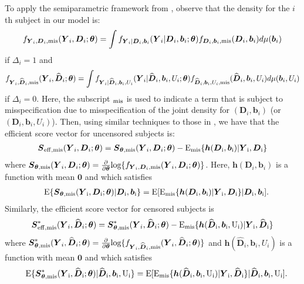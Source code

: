 \documentclass[12pt]{article}
\def\log{\hbox{log}}
\def\bse{\begin{eqnarray*}}
\def\ese{\end{eqnarray*}}
\def\be{\begin{eqnarray}}
\def\ee{\end{eqnarray}}
\def\bse{\begin{eqnarray*}}
\def\ese{\end{eqnarray*}}
\def\bS{{\mathbf S}}
\def\bzero{{\mathbf 0}}
\def\btheta{{\boldsymbol{\theta}}}
\def\bzero{{\boldsymbol{0}}}
\def\bb{{\boldsymbol b}}
\def\bh{{\boldsymbol h}}
\def\bD{{\boldsymbol D}}
\def\bS{{\boldsymbol S}}
\def\bY{{\boldsymbol Y}}
\def\tilD{\bD}
\def\E{\rm E}
\begin{document}
To apply the semiparametric framework from \citet{garcia2016optimal}, observe that the density for the $i$th subject in our model is:
\bse
f_{\bY_i,\tilD_i,{\rm mis}}(\bY_i,\tilD_i;\btheta)= \int f_{\bY_i|\tilD_i,\bb_i}(\bY_i|\tilD_i,\bb_i;\btheta)f_{\tilD_i,\bb_i,{\rm mis}}(\tilD_i,\bb_i)d\mu(\bb_i)
\ese
if $\Delta_i=1$ and \bse
f_{\bY_i,\widehat{\tilD}_i,{\rm mis}}(\bY_i,\widehat{\tilD}_i;\btheta)= \int f_{\bY_i|\widehat{\tilD}_i,\bb_i,U_i}(\bY_i|\widehat{\tilD}_i,\bb_i,U_i;\btheta)f_{\widehat{\tilD}_i,\bb_i,U_i,{\rm mis}}(\widehat{\tilD}_i,\bb_i,U_i)d\mu(\bb_{i}, U_i)
\ese
if $\Delta_i=0$. Here, the subscript $_{\rm{mis}}$ is used to indicate a term that is subject to misspecification due to misspecification of the joint density for $(\tilD_i, \bb_i)$ (or $(\tilD_i, \bb_i, U_i)$). Then, using similar techniques to those in \cite{garcia2016optimal}, we have that the efficient score vector for uncensored subjects  is:
\be
\label{eqn:orig_score_vec_uncens}
\bS_{\rm eff, mis}(\bY_i,\tilD_i;\btheta)=\bS_{\rm \btheta, mis}(\bY_i,\tilD_i;\btheta)-\E_{\rm{mis}}\{\bh(\tilD_i,\bb_i)|\bY_i,\tilD_i\}
\ee
where $\bS_{\rm \btheta, mis}(\bY_i,\tilD_i;\btheta)=\frac{\partial}{\partial \btheta}\log\{f_{\bY_i,\tilD_i,{\rm mis}}(\bY_i,\tilD_i;\btheta)\}$. Here, $\bh(\tilD_i,\bb_i)$ is a function with mean $\bzero$ and which satisfies
\bse
&&\E\{\bS_{\btheta, \rm{mis}}(\bY_i,\tilD_i;\btheta)|\tilD_i,\bb_i\}=\E[\E_{\rm{mis}}\{\bh(\tilD_i,\bb_i)|\bY_i,\tilD_i\}|\tilD_i,\bb_i].
\ese
Similarly, the efficient score vector for censored subjects is
\be
\label{eqn:orig_score_vec_cens}
\bS_{\rm eff, mis}^*(\bY_i,\widehat{\tilD}_i;\btheta)=\bS_{\rm \btheta, mis}^*(\bY_i,\widehat{\tilD}_i;\btheta)-\E_{\rm{mis}}\{\bh(\widehat{\tilD}_i,\bb_i,U_i)|\bY_i,\widehat{\tilD}_i\}
\ee
where $\bS_{\rm \btheta, mis}^*(\bY_i,\widehat{\tilD}_i;\btheta)=\frac{\partial}{\partial \btheta}\log\{f_{\bY_i,\widehat{\tilD}_i,{\rm mis}}(\bY_i,\widehat{\tilD}_i;\btheta)\}$ and  $\bh(\widehat{\tilD}_i,\bb_i,U_i)$ is a function with mean $\bzero$ and which satisfies
\bse
&&\E\{\bS_{\btheta, \rm{mis}}^*(\bY_i,\widehat{\tilD}_i;\btheta)|\widehat{\tilD}_i,\bb_i,U_i\}=\E[\E_{\rm{mis}}\{\bh(\widehat{\tilD}_i,\bb_i,U_i)|\bY_i,\widehat{\tilD}_i\}|\widehat{\tilD}_i,\bb_i,U_i].
\ese
\end{document}
